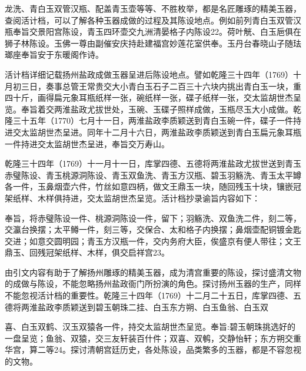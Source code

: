 \noindent 龙洗、青白玉双管汉瓶、配盖青玉壶等等、不胜枚举，都是名匠雕琢的精美玉器，查阅活计档，可以了解各种玉器成做的过程及其陈设地点。例如前列青白玉双管汉瓶奉旨交景阳宫陈设，青玉四环壶交九洲清晏格子内陈设22。荷叶觥、白玉巵俱在狮子林陈设。玉佛一尊由副催安庆持赴建福宫妙莲花室供奉。玉丹台春晓山子随珐瑯座奉旨安于东暖阁作诗。

活计档详细记载扬州盐政成做玉器呈进后陈设地点。譬如乾隆三十四年（1769）十月初三日，奏事总管王常贵交大小青白玉石子二百三十六块内挑出青白玉一块，重四十斤，画得扁元象耳瓶纸样一张，碗纸样一张，碟子纸样一张，交太监胡世杰呈览。奉旨着交两淮盐政尤拔世处，玉碗、玉碟子照样成做，玉瓶尽玉大小成做。乾隆三十五年（1770）七月十一日，两淮盐政李质颖送到青白玉碗一件，碟子一件持进交太监胡世杰呈进。同年十二月十六日，两淮盐政李质颖送到青白玉扁元象耳瓶一件持进交太监胡世杰呈进，奉旨交万寿山。

乾隆三十四年（1769）十一月十一日，库掌四德、五德将两淮盐政尤拔世送到青玉赤璧陈设、青玉桃源洞陈设、青玉双鱼洗、青玉方汉瓶、碧玉羽觞洗、青玉太平罇各一件，玉鼻烟壶六件，竹丝如意四柄，做文王鼎玉一块，随回残玉十块，镶嵌冠架纸样、木样俱持进，交太监胡世杰呈览。活计档抄录谕旨内容如下：

\begin{BookQuote}
奉旨，将赤璧陈设一件、桃源洞陈设一件，留下；羽觞洗、双鱼洗二件，刻二等，交瀛台换摆；太平鳟一件，刻三等，交保合、太和格子内换摆；鼻烟壶配铜镀金匙交进；如意交圆明园；青玉方汉瓶一件，交内务府大臣，俟盛京有便人带往；文王鼎玉、回残冠架纸样、木样，俱交启祥宫23。
\end{BookQuote}

由引文内容有助于了解扬州雕琢的精美玉器，成为清宫重要的陈设，探讨盛清文物的成做与陈设，不能忽略扬州盐政衙门所扮演的角色。探讨扬州玉器的生产，同样不能忽视活计档的重要性。乾隆三十四年（1769）十二月二十五日，库掌四德、五德将两淮盐政李质颖送到碧玉朝珠二挂、白玉东方朔、白玉鱼翁、白玉双

\vfill
\begin{BookNotes}
\end{BookNotes}

\noindent 喜、白玉双鹤、汉玉双猿各一件，持交太监胡世杰呈览。奉旨:碧玉朝珠挑选好的一盘呈览；鱼翁、双猿，交三友轩装百什件；双喜、双鹌，交静怡轩；东方朔交重华宫，算二等24。探讨清朝宫廷历史，各处陈设，品类繁多的玉器，都是不容忽视的文物。

